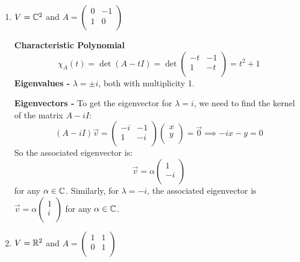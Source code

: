 \documentclass[../main.tex]{subfiles}
\begin{document}
\begin{example}
  \begin{enumerate}
    \item $V = \mathbb{C}^{2}$ and $A = \begin{pmatrix}
        0 & -1 \\
        1 & 0 \\
        \end{pmatrix}$

      \textbf{Characteristic Polynomial}
      \[
        \chi_A(t) = \det (A - tI) = \det \begin{pmatrix}
        -t & -1 \\
        1 & -t \\
        \end{pmatrix} = t^2  + 1
      \]
      \textbf{Eigenvalues -} $\lambda = \pm i$, both with multiplicity 1. \par
      \textbf{Eigenvectors -}
      To get the eigenvector for $\lambda = i$, we need to find the kernel of the matrix $A - iI$:
      \[
        (A - iI)\vec{v} =
        \begin{pmatrix}
        -i & -1 \\
        1 & -i \\
        \end{pmatrix}
        \begin{pmatrix}
        x \\
        y \\
        \end{pmatrix} = \vec{0} \implies
        -ix - y = 0
      \]
      So the associated eigenvector is:
      \[
        \vec{v} = \alpha \begin{pmatrix}
        1 \\
        -i \\
        \end{pmatrix}
      \]
      for any $\alpha \in \mathbb{C}$.
      Similarly, for $\lambda = -i$, the associated eigenvector is $\vec{v} = \alpha\begin{pmatrix}
      1 \\
      i \\
      \end{pmatrix}$ for any $\alpha \in \mathbb{C}$.
    \item $V = \mathbb{R}^2$ and $A = \begin{pmatrix}
      1 & 1 \\
      0 & 1 \\
      \end{pmatrix}$


\end{enumerate}
\end{example}
\end{document}

